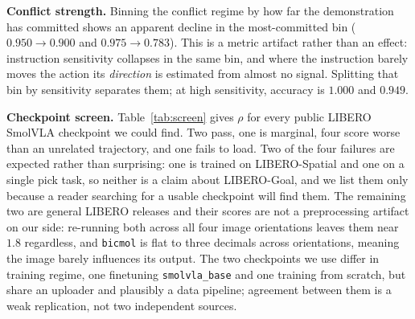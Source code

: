 \documentclass{article}
\begin{document}
\textbf{Conflict strength.} Binning the conflict regime by how far the demonstration has
committed shows an apparent decline in the most-committed bin ($0.950 \to 0.900$ and
$0.975 \to 0.783$). This is a metric artifact rather than an effect: instruction sensitivity
collapses in the same bin, and where the instruction barely moves the action its \emph{direction}
is estimated from almost no signal. Splitting that bin by sensitivity separates them; at high
sensitivity, accuracy is $1.000$ and $0.949$.

\textbf{Checkpoint screen.} Table~\ref{tab:screen} gives $\rho$ for every public LIBERO
SmolVLA checkpoint we could find. Two pass, one is marginal, four score worse than an unrelated
trajectory, and one fails to load. Two of the four failures are expected rather than surprising:
one is trained on LIBERO-Spatial and one on a single pick task, so neither is a claim about
LIBERO-Goal, and we list them only because a reader searching for a usable checkpoint will find
them. The remaining two are general LIBERO releases and their scores are not a preprocessing
artifact on our side: re-running both across all four image orientations leaves them near $1.8$
regardless, and \texttt{bicmol} is flat to three decimals across orientations, meaning the image
barely influences its output. The two checkpoints we use differ in training regime, one
finetuning \texttt{smolvla\_base} and one training from scratch, but share an uploader and
plausibly a data pipeline; agreement between them is a weak replication, not two independent
sources.
\end{document}

